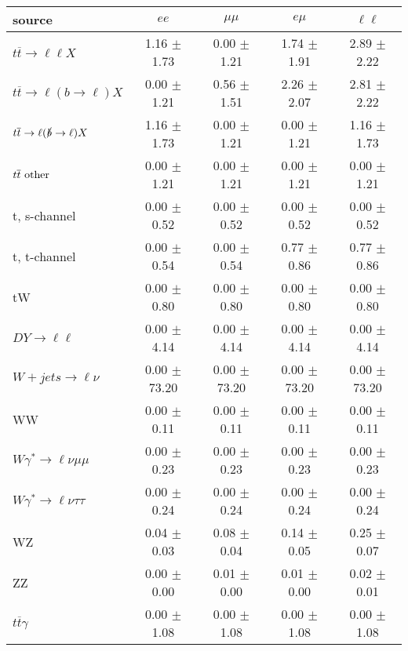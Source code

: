 \begin{tabular}{l|cccc} \hline\hline
source & $ee$ & $\mu\mu$ & $e\mu$ & $\ell\ell $ \\
\hline
$t\overline{t} \rightarrow \ell \ell X$ &  1.16 $\pm$  1.73 &  0.00 $\pm$  1.21 &  1.74 $\pm$  1.91 &  2.89 $\pm$  2.22 \\
$t\overline{t} \rightarrow \ell (b \rightarrow \ell) X$ &  0.00 $\pm$  1.21 &  0.56 $\pm$  1.51 &  2.26 $\pm$  2.07 &  2.81 $\pm$  2.22 \\
$t\overline{t} \rightarrow \ell (\slashed b \rightarrow \ell) X$ &  1.16 $\pm$  1.73 &  0.00 $\pm$  1.21 &  0.00 $\pm$  1.21 &  1.16 $\pm$  1.73 \\
        $t\overline{t}\ \rm{other}$ &  0.00 $\pm$  1.21 &  0.00 $\pm$  1.21 &  0.00 $\pm$  1.21 &  0.00 $\pm$  1.21 \\
\hline
                       t, s-channel &  0.00 $\pm$  0.52 &  0.00 $\pm$  0.52 &  0.00 $\pm$  0.52 &  0.00 $\pm$  0.52 \\
                       t, t-channel &  0.00 $\pm$  0.54 &  0.00 $\pm$  0.54 &  0.77 $\pm$  0.86 &  0.77 $\pm$  0.86 \\
                                 tW &  0.00 $\pm$  0.80 &  0.00 $\pm$  0.80 &  0.00 $\pm$  0.80 &  0.00 $\pm$  0.80 \\
\hline
         $DY \rightarrow \ell \ell$ &  0.00 $\pm$  4.14 &  0.00 $\pm$  4.14 &  0.00 $\pm$  4.14 &  0.00 $\pm$  4.14 \\
      $W+jets \rightarrow \ell \nu$ &  0.00 $\pm$ 73.20 &  0.00 $\pm$ 73.20 &  0.00 $\pm$ 73.20 &  0.00 $\pm$ 73.20 \\
                                 WW &  0.00 $\pm$  0.11 &  0.00 $\pm$  0.11 &  0.00 $\pm$  0.11 &  0.00 $\pm$  0.11 \\
\hline
$W\gamma^{*} \rightarrow \ell \nu \mu\mu$ &  0.00 $\pm$  0.23 &  0.00 $\pm$  0.23 &  0.00 $\pm$  0.23 &  0.00 $\pm$  0.23 \\
$W\gamma^{*} \rightarrow \ell \nu \tau\tau$ &  0.00 $\pm$  0.24 &  0.00 $\pm$  0.24 &  0.00 $\pm$  0.24 &  0.00 $\pm$  0.24 \\
                                 WZ &  0.04 $\pm$  0.03 &  0.08 $\pm$  0.04 &  0.14 $\pm$  0.05 &  0.25 $\pm$  0.07 \\
                                 ZZ &  0.00 $\pm$  0.00 &  0.01 $\pm$  0.00 &  0.01 $\pm$  0.00 &  0.02 $\pm$  0.01 \\
\hline
              $t\overline{t}\gamma$ &  0.00 $\pm$  1.08 &  0.00 $\pm$  1.08 &  0.00 $\pm$  1.08 &  0.00 $\pm$  1.08 \\

\end{tabular}
